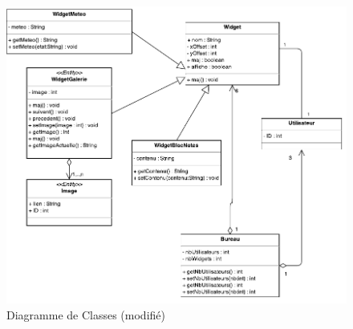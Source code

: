 \begin{figure}[H]
	\centering
	\includegraphics[angle=90]{diagrammes/DClasses.pdf}
	\caption{\color{ForestGreen}Diagramme de Classes (modifié)\color{black}}
\end{figure}